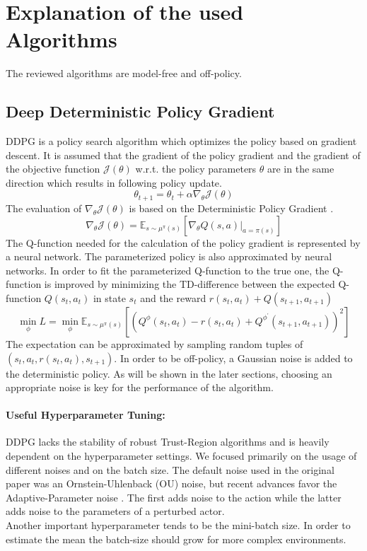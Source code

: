 \section{Explanation of the used Algorithms}\label{sec_algorihtms}
The reviewed algorithms are model-free and off-policy.  
\subsection{Deep Deterministic Policy Gradient}
DDPG \cite{Lillicrap2015} is a policy search algorithm which optimizes the policy based on gradient descent. It is assumed that the gradient of the policy gradient and the gradient of the objective function $\mathcal{J}(\theta)$ w.r.t. the policy parameters $\theta$ are in the same direction which results in following policy update.
\begin{equation}
	\theta_{t+1} = \theta_{t} + \alpha \nabla_{\theta}\mathcal{J}(\theta)
\end{equation} 
The evaluation of $\nabla_{\theta}\mathcal{J}(\theta)$ is based on the Deterministic Policy Gradient \cite{Silver2014}.
\begin{equation}
	\nabla_{\theta}\mathcal{J}(\theta) = \mathbb{E}_{s\sim\mu^{\pi}(s)}\left[\nabla_{\theta}Q(s,a)|_{a=\pi(s)}\right]
\end{equation}
The Q-function needed for the calculation of the policy gradient is represented by a neural network. The parameterized policy is also approximated by neural networks. In order to fit the parameterized Q-function to the true one, the Q-function is improved by minimizing the TD-difference between the expected Q-function $Q(s_{t}, a_{t})$ in state $s_{t}$ and the reward $r(s_{t},a_{t}) + Q(s_{t+1},a_{t+1})$
\begin{equation}
	\min\limits_{\phi}L = \min\limits_{\phi} \mathbb{E}_{s\sim\mu^{\pi}(s)}\left[\left(Q^{\phi}(s_{t}, a_{t}) - r(s_{t},a_{t}) + Q^{\phi^{\prime}}(s_{t+1},a_{t+1})\right)^{2}\right]
\end{equation}
The expectation can be approximated by sampling random tuples of $(s_{t}, a_{t}, r(s_{t}, a_{t}), s_{t+1})$.
In order to be off-policy, a Gaussian noise is added to the deterministic policy. As will be shown in the later sections, choosing an appropriate noise is key for the performance of the algorithm.
\paragraph{Useful Hyperparameter Tuning:}
DDPG lacks the stability of robust Trust-Region algorithms and is heavily dependent on the hyperparameter settings. We focused primarily on the usage of different noises and on the batch size. The default noise used in the original paper was an Ornstein-Uhlenback (OU) noise, but recent advances favor the Adaptive-Parameter noise \cite{Plappert2017}. The first adds noise to the action while the latter adds noise to the parameters of a perturbed actor.\\
Another important hyperparameter tends to be the mini-batch size. In order to estimate the mean the batch-size should grow for more complex environments.

